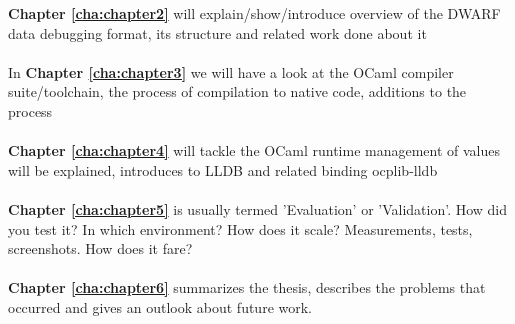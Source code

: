 \textbf{Chapter \ref{cha:chapter2}} will explain/show/introduce overview of the DWARF data debugging format, its structure and related work done about it
\\
\\
In \textbf{Chapter \ref{cha:chapter3}} we will have a look at the OCaml compiler suite/toolchain, the process of compilation to native code, additions to the process
\\
\\
\textbf{Chapter \ref{cha:chapter4}} will tackle the OCaml runtime management of values will be explained, introduces to LLDB and related binding ocplib-lldb
\\
\\
\textbf{Chapter \ref{cha:chapter5}} is usually termed 'Evaluation' or 'Validation'. How did you test it? In which environment? How does it scale? Measurements, tests, screenshots. How does it fare?
\\
\\
\textbf{Chapter \ref{cha:chapter6}} summarizes the thesis, describes the problems that occurred and gives an outlook about future work.


